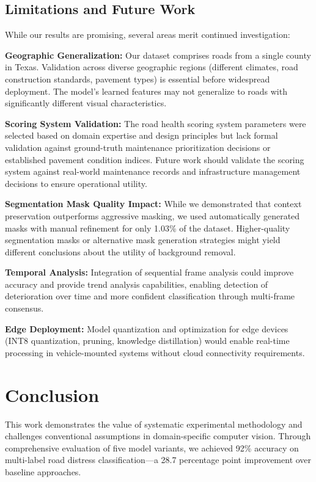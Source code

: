 \documentclass[12pt]{article}
\begin{document}
\subsection{Limitations and Future Work}

While our results are promising, several areas merit continued investigation:

\textbf{Geographic Generalization:} Our dataset comprises roads from a single county in Texas. Validation across diverse geographic regions (different climates, road construction standards, pavement types) is essential before widespread deployment. The model's learned features may not generalize to roads with significantly different visual characteristics.

\textbf{Scoring System Validation:} The road health scoring system parameters were selected based on domain expertise and design principles but lack formal validation against ground-truth maintenance prioritization decisions or established pavement condition indices. Future work should validate the scoring system against real-world maintenance records and infrastructure management decisions to ensure operational utility.

\textbf{Segmentation Mask Quality Impact:} While we demonstrated that context preservation outperforms aggressive masking, we used automatically generated masks with manual refinement for only 1.03\% of the dataset. Higher-quality segmentation masks or alternative mask generation strategies might yield different conclusions about the utility of background removal.

\textbf{Temporal Analysis:} Integration of sequential frame analysis could improve accuracy and provide trend analysis capabilities, enabling detection of deterioration over time and more confident classification through multi-frame consensus.

\textbf{Edge Deployment:} Model quantization and optimization for edge devices (INT8 quantization, pruning, knowledge distillation) would enable real-time processing in vehicle-mounted systems without cloud connectivity requirements.

\section{Conclusion}

This work demonstrates the value of systematic experimental methodology and challenges conventional assumptions in domain-specific computer vision. Through comprehensive evaluation of five model variants, we achieved 92\% accuracy on multi-label road distress classification—a 28.7 percentage point improvement over baseline approaches.
\end{document}

